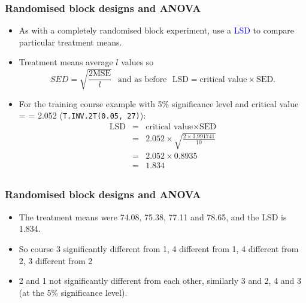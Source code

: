 \documentclass[12pt,xcolor=dvipsnames,handout,mathserif,aspectratio=169]{beamer}
\newcommand{\tc}{\textcolor}
\begin{document}
\begin{frame}
\frametitle{Randomised block designs and ANOVA}
\begin{itemize}
\item As with a completely randomised block experiment, use a \tc{blue}{LSD} to compare particular treatment means.
\vspace{0.2cm}
\item Treatment means average $l$ values so
$$SED = \sqrt{\frac{2 \mbox{MSE}}{l}}\,\,\,\ \mbox{and as before} \,\,\,\, \mbox{LSD} = \mbox{critical value} \times \mbox{SED}.$$
\vspace{0.1cm}
\item For the training course example with 5\% significance level and critical value = =  2.052 (\texttt{T.INV.2T(0.05, 27)}):
\begin{eqnarray*}
\mbox{LSD} &=&  \mbox{critical value}\times \mbox{SED}\\
 & = & 2.052 \times \sqrt{\frac{2 \times 3.991741}{10}}\\
&=& 2.052  \times 0.8935\\
&=&  1.834\\
\end{eqnarray*}
\end{itemize}
\end{frame}


\begin{frame}\frametitle{Randomised block designs and ANOVA}
\begin{itemize}
\item The treatment means were 74.08, 75.38, 77.11 and 78.65, and the LSD is 1.834.
\item So course 3 significantly different from 1, 4 different from 1, 4 different from 2, 3 different from 2
\item 2 and 1 not significantly different from each other, similarly 3 and 2, 4 and 3 (at the 5\% significance level).

\end{itemize}
\end{frame}
\end{document}
